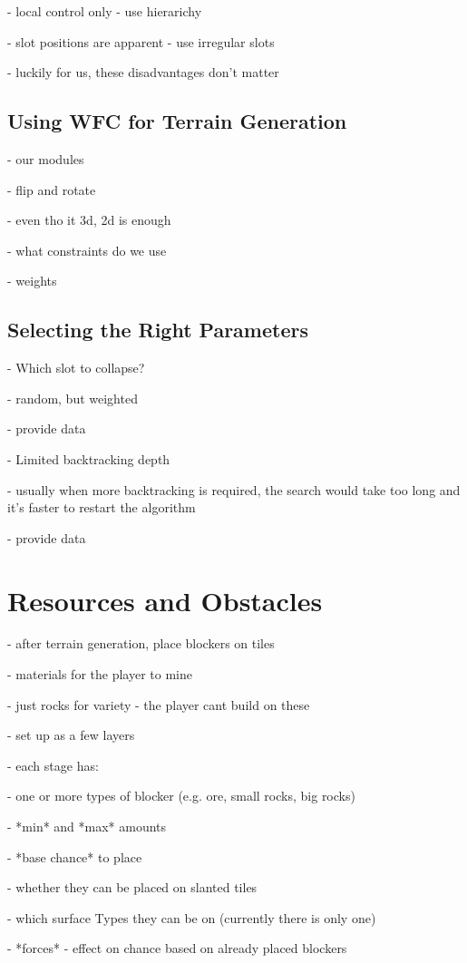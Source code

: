 - local control only - use hierarichy

- slot positions are apparent - use irregular slots

- luckily for us, these disadvantages don't matter

\subsection{Using WFC for Terrain Generation}

- our modules

- flip and rotate

- even tho it 3d, 2d is enough

- what constraints do we use

- weights

\subsection{Selecting the Right Parameters}

- Which slot to collapse?

- random, but weighted

- provide data

- Limited backtracking depth

- usually when more backtracking is required, the search would take too long and it's faster to restart the algorithm

- provide data

\section{Resources and Obstacles}

- after terrain generation, place blockers on tiles

- materials for the player to mine

- just rocks for variety - the player cant build on these

- set up as a few layers

- each stage has:

- one or more types of blocker (e.g. ore, small rocks, big rocks)

- *min* and *max* amounts

- *base chance* to place

- whether they can be placed on slanted tiles

- which surface Types they can be on (currently there is only one)

- *forces* - effect on chance based on already placed blockers

